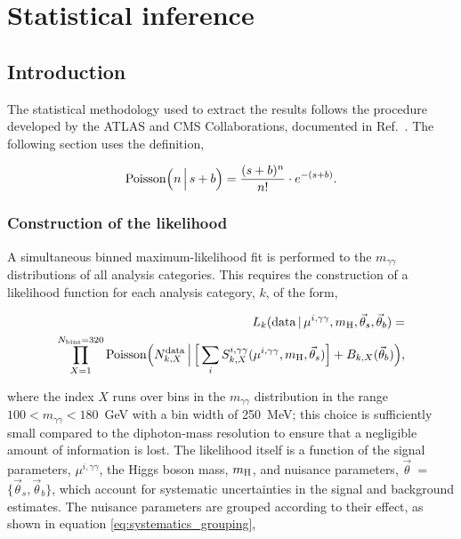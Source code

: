 \chapter{Statistical inference}
\label{chap:hgg_stats}

\section{Introduction}
The statistical methodology used to extract the results follows the procedure developed by the ATLAS and CMS Collaborations, documented in Ref.~\cite{Khachatryan:2014jba}. The following section uses the definition,

\begin{equation}\label{eq:poisson_def}
    {\rm{Poisson}}\Big(n\,\Big|\,s+b\Big) = \frac{(s+b)^n}{n!} \cdot e^{-(s+b)}.
\end{equation}

\subsection{Construction of the likelihood}\label{sec:category_likelihood}
A simultaneous binned maximum-likelihood fit is performed to the $m_{\gamma\gamma}$ distributions of all analysis categories. This requires the construction of a likelihood function for each analysis category, $k$, of the form,

\begin{equation}\label{eq:category_likelihood}
\begin{split}
    L_k({\rm{data}}\,|\,\mu^{i,\gamma\gamma},m_{\rm{H}},\vec{\theta}_s,\vec{\theta}_b) = \\
    \prod^{N_{\rm{bins}}=320}_{X=1} {\rm{Poisson}} \Big( N_{k,X}^{\rm{data}} \, \Big| \, \Big[ \sum_{i} S_{k,X}^{i,\gamma\gamma}(\mu^{i,\gamma\gamma},m_{\rm{H}},\vec{\theta}_s)\Big] + B_{k,X}(\vec{\theta}_b) \Big),        
\end{split}
\end{equation}


\noindent
where the index $X$ runs over bins in the $m_{\gamma\gamma}$ distribution in the range $100<m_{\gamma\gamma}<180$~GeV with a bin width of 250~MeV; this choice is sufficiently small compared to the diphoton-mass resolution to ensure that a negligible amount of information is lost. The likelihood itself is a function of the signal parameters, $\mu^{i,\gamma\gamma}$, the Higgs boson mass, $m_{\rm{H}}$, and nuisance parameters, $\vec{\theta}$~=~$\{\vec{\theta}_s,\vec{\theta}_b\}$, which account for systematic uncertainties in the signal and background estimates. The nuisance parameters are grouped according to their effect, as shown in equation \ref{eq:systematics_grouping},

